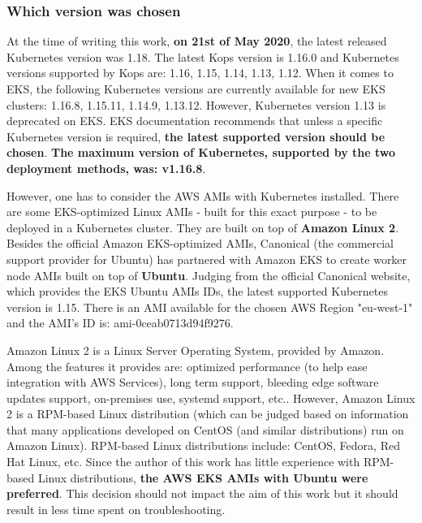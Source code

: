 \subsubsection{Which version was chosen}
At the time of writing this work, \textbf{on 21st of May 2020}, the latest released Kubernetes version was 1.18\cite{online-k8s-blog-latest}. The latest Kops version is 1.16.0 and Kubernetes versions supported by Kops are: 1.16, 1.15, 1.14, 1.13, 1.12\cite{online-kops-versions}. When it comes to EKS, the following Kubernetes versions are currently available for new EKS clusters: 1.16.8, 1.15.11, 1.14.9, 1.13.12. However, Kubernetes version 1.13 is deprecated on EKS. EKS documentation recommends that unless a specific Kubernetes version is required, \textbf{the latest supported version should be chosen}\cite{online-eksctl-versions}. \textbf{The maximum version of Kubernetes, supported by the two deployment methods, was: v1.16.8}.

However, one has to consider the AWS AMIs with Kubernetes installed. There are some EKS-optimized Linux AMIs - built for this exact purpose - to be deployed in a Kubernetes cluster. They are built on top of \textbf{Amazon Linux 2}\cite{eks-optimized-ami}. Besides the official Amazon EKS-optimized AMIs, Canonical (the commercial support provider for Ubuntu) has partnered with Amazon EKS to create worker node AMIs built on top of \textbf{Ubuntu}\cite{eks-ubu}. Judging from the official Canonical website, which provides the EKS Ubuntu AMIs IDs, the latest supported Kubernetes version is 1.15. There is an AMI available for the chosen AWS Region "eu-west-1" and the AMI's ID is: ami-0ceab0713d94f9276\cite{eks-ubu-ami-id}.

Amazon Linux 2 is a Linux Server Operating System, provided by Amazon. Among the features it provides are: optimized performance (to help ease integration with AWS Services), long term support, bleeding edge software updates support, on-premises use, systemd support, etc.\cite{al2}. However, Amazon Linux 2 is a RPM-based Linux distribution (which can be judged based on information that many applications developed on CentOS (and similar distributions) run on Amazon Linux)\cite{al2-centos}. RPM-based Linux distributions include: CentOS, Fedora, Red Hat Linux, etc. Since the author of this work has little experience with RPM-based Linux distributions, \textbf{the AWS EKS AMIs with Ubuntu were preferred}. This decision should not impact the aim of this work but it should result in less time spent on troubleshooting.

